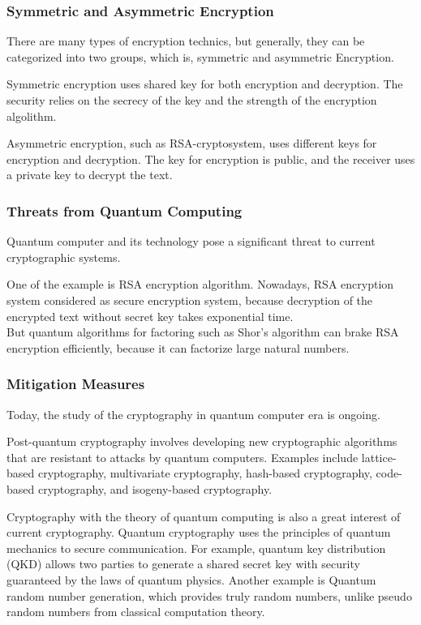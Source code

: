 \documentclass[10pt]{article}
\begin{document}
    \subsubsection{Symmetric and Asymmetric Encryption}
    There are many types of encryption technics, but generally, they can be categorized into two groups, which is, symmetric and asymmetric Encryption.

    Symmetric encryption uses shared key for both encryption and decryption. The security relies on the secrecy of the key and the strength of the encryption algolithm.

    Asymmetric encryption, such as RSA-cryptosystem, uses different keys for encryption and decryption. The key for encryption is public, and the receiver uses a private key to decrypt the text.
    \subsubsection{Threats from Quantum Computing}
    Quantum computer and its technology pose a significant threat to current cryptographic systems.

    One of the example is RSA encryption algorithm. Nowadays, RSA encryption system considered as secure encryption system, because decryption of the encrypted text without secret key takes exponential time.
    \\But quantum algorithms for factoring such as Shor's algorithm can brake RSA encryption efficiently, because it can factorize large natural numbers.

    \subsubsection{Mitigation Measures}
    Today, the study of the cryptography in quantum computer era is ongoing.

    Post-quantum cryptography involves developing new cryptographic algorithms that are resistant to attacks by quantum computers.  Examples include lattice-based cryptography, multivariate cryptography, hash-based cryptography, code-based cryptography, and isogeny-based cryptography.

    Cryptography with the theory of quantum computing is also a great interest of current cryptography.
    Quantum cryptography uses the principles of quantum mechanics to secure communication. For example, quantum key distribution (QKD) allows two parties to generate a shared secret key with security guaranteed by the laws of quantum physics. Another example is Quantum random number generation, which provides truly random numbers, unlike pseudo random numbers from classical computation theory.

    \nocite{a1,b1}
    

    
\end{document}
